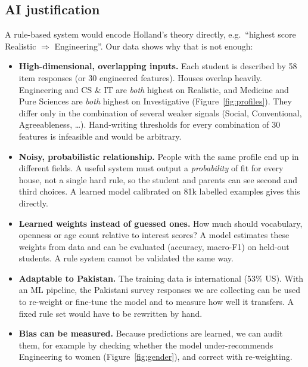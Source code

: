 \documentclass[11pt,a4paper]{article}
\begin{document}
\subsection{AI justification}
A rule-based system would encode Holland's theory directly, e.g.\ ``highest score Realistic
$\Rightarrow$ Engineering''. Our data shows why that is not enough:
\begin{itemize}
\item \textbf{High-dimensional, overlapping inputs.} Each student is described by 58 item
      responses (or 30 engineered features). Houses overlap heavily. Engineering and CS \& IT are
      \emph{both} highest on Realistic, and Medicine and Pure Sciences are \emph{both} highest on
      Investigative (Figure~\ref{fig:profiles}). They differ only in the combination of several
      weaker signals (Social, Conventional, Agreeableness, \ldots). Hand-writing thresholds for
      every combination of 30 features is infeasible and would be arbitrary.
\item \textbf{Noisy, probabilistic relationship.} People with the same profile end up in
      different fields. A useful system must output a \emph{probability} of fit for every house,
      not a single hard rule, so the student and parents can see second and third choices. A
      learned model calibrated on 81k labelled examples gives this directly.
\item \textbf{Learned weights instead of guessed ones.} How much should vocabulary, openness or
      age count relative to interest scores? A model estimates these weights from data and can be
      evaluated (accuracy, macro-F1) on held-out students. A rule system cannot be validated the
      same way.
\item \textbf{Adaptable to Pakistan.} The training data is international (53\% US). With an ML
      pipeline, the Pakistani survey responses we are collecting can be used to re-weight or
      fine-tune the model and to measure how well it transfers. A fixed rule set would have to be
      rewritten by hand.
\item \textbf{Bias can be measured.} Because predictions are learned, we can audit them, for
      example by checking whether the model under-recommends Engineering to women
      (Figure~\ref{fig:gender}), and correct with re-weighting.
\end{itemize}
\end{document}
